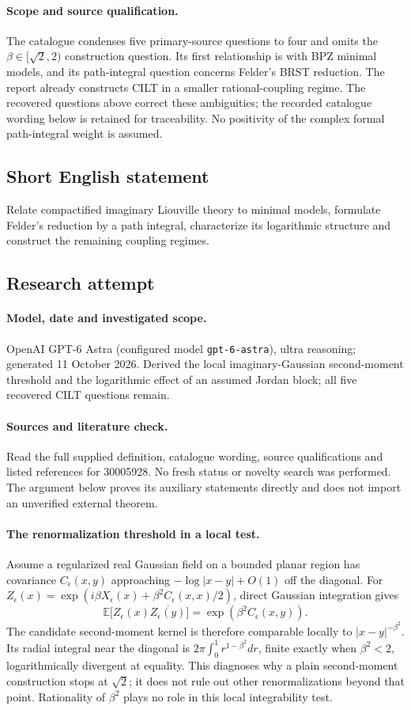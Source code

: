 \documentclass[11pt]{article}
\begin{document}
\paragraph{Scope and source qualification.}The catalogue condenses five primary-source questions to four and omits the $\beta\in[\sqrt2,2)$ construction question. Its first relationship is with BPZ minimal models, and its path-integral question concerns Felder's BRST reduction. The report already constructs CILT in a smaller rational-coupling regime. The recovered questions above correct these ambiguities; the recorded catalogue wording below is retained for traceability. No positivity of the complex formal path-integral weight is assumed.
\subsection{Short English statement}
Relate compactified imaginary Liouville theory to minimal models, formulate Felder's reduction by a path integral, characterize its logarithmic structure and construct the remaining coupling regimes.
\subsection{Research attempt}
\paragraph{Model, date and investigated scope.}
OpenAI GPT-6 Astra (configured model \texttt{gpt-6-astra}), ultra reasoning; generated 11 October 2026. Derived the local imaginary-Gaussian second-moment threshold and the logarithmic effect of an assumed Jordan block; all five recovered CILT questions remain.

\paragraph{Sources and literature check.}
Read the full supplied definition, catalogue wording, source qualifications and listed references for 30005928. No fresh status or novelty search was performed. The argument below proves its auxiliary statements directly and does not import an unverified external theorem.

\paragraph{The renormalization threshold in a local test.} Assume a regularized real Gaussian field on a bounded planar region has covariance \(C_\epsilon(x,y)\) approaching \(-\log|x-y|+O(1)\) off the diagonal. For \(Z_\epsilon(x)=\exp(i\beta X_\epsilon(x)+\beta^2C_\epsilon(x,x)/2)\), direct Gaussian integration gives
\[
 \mathbb E\bigl[Z_\epsilon(x)\overline{Z_\epsilon(y)}\bigr]
 =\exp(\beta^2 C_\epsilon(x,y)).
\]
The candidate second-moment kernel is therefore comparable locally to \(|x-y|^{-\beta^2}\). Its radial integral near the diagonal is \(2\pi\int_0^1r^{1-\beta^2}dr\), finite exactly when \(\beta^2<2\), logarithmically divergent at equality. This diagnoses why a plain second-moment construction stops at \(\sqrt2\); it does not rule out other renormalizations beyond that point. Rationality of \(\beta^2\) plays no role in this local integrability test.
\end{document}
